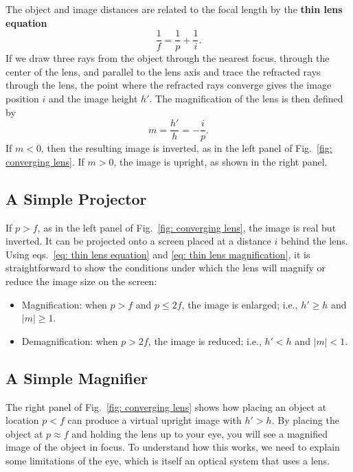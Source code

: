 \documentclass[addpoints]{physlabs}
\begin{document}
\begin{labsection}
\begin{theory}
    \noindent
    The object and image distances are related to the focal length by the \textbf{thin lens equation}
    \begin{equation}\label{eq: thin lens equation}
        \frac{1}{f}=\frac{1}{p}+\frac{1}{i}.
    \end{equation}
    If we draw three rays from the object through the nearest focus, through the center of the lens, and parallel to the lens axis and trace the refracted rays through the lens, the point where the refracted rays converge gives the image position $i$ and the image height $h'$. The magnification of the lens is then defined by
    \begin{equation}\label{eq: thin lens magnification}
        m = \frac{h'}{h} = -\frac{i}{p}.
    \end{equation}
    If $m<0$, then the resulting image is inverted, as in the left panel of Fig.~\ref{fig: converging lens}. If $m>0$, the image is upright, as shown in the right panel.

    \subsection*{A Simple Projector}

    If $p>f$, as in the left panel of Fig.~\ref{fig: converging lens}, the image is real but inverted. It can be projected onto a screen placed at a distance $i$ behind the lens. Using eqs.~\ref{eq: thin lens equation} and \ref{eq: thin lens magnification}, it is straightforward to show the conditions under which the lens will magnify or reduce the image size on the screen:
    \begin{itemize}
        \item Magnification: when $p>f$ and $p\leq2f$, the image is enlarged; i.e., $h'\geq h$ and $|m|\geq1$.
        \item Demagnification: when $p>2f$, the image is reduced; i.e., $h'<h$ and $|m|<1$.
    \end{itemize}

    \subsection*{A Simple Magnifier}
    
    The right panel of Fig.~\ref{fig: converging lens} shows how placing an object at location $p<f$ can produce a virtual upright image with $h'>h$. By placing the object at $p\approx f$ and holding the lens up to your eye, you will see a magnified image of the object in focus. To understand how this works, we need to explain some limitations of the eye, which is itself an optical system that uses a lens.


\end{theory}
\end{labsection}
\end{document}
